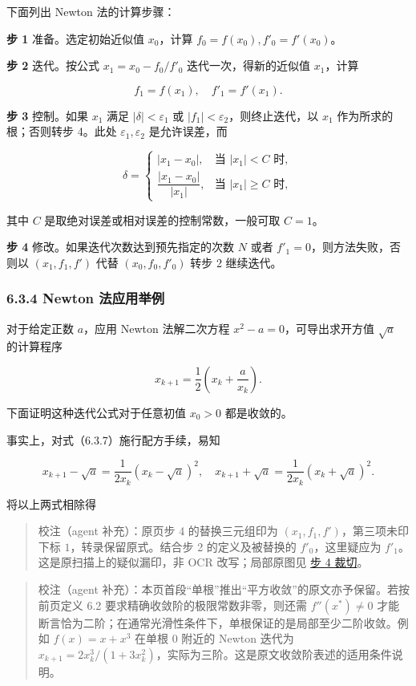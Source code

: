 下面列出 Newton 法的计算步骤：

\textbf{步 1} 准备。选定初始近似值 \(x_0\)，计算 \(f_0=f(x_0),f'_0=f'(x_0)\)。

\textbf{步 2} 迭代。按公式 \(x_1=x_0-f_0/f'_0\) 迭代一次，得新的近似值 \(x_1\)，计算

\[
f_1=f(x_1),\quad f'_1=f'(x_1).
\]

\textbf{步 3} 控制。如果 \(x_1\) 满足 \(|\delta|<\varepsilon_1\) 或 \(|f_1|<\varepsilon_2\)，则终止迭代，以 \(x_1\) 作为所求的根；否则转步 4。此处 \(\varepsilon_1,\varepsilon_2\) 是允许误差，而

\[
\delta=\begin{cases}
|x_1-x_0|,&\text{当 }|x_1|<C\text{ 时},\\
\dfrac{|x_1-x_0|}{|x_1|},&\text{当 }|x_1|\geqslant C\text{ 时},
\end{cases}
\]

其中 \(C\) 是取绝对误差或相对误差的控制常数，一般可取 \(C=1\)。

\textbf{步 4} 修改。如果迭代次数达到预先指定的次数 \(N\) 或者 \(f'_1=0\)，则方法失败，否则以 \((x_1,f_1,f')\) 代替 \((x_0,f_0,f'_0)\) 转步 2 继续迭代。

\subsubsection{6.3.4 Newton 法应用举例}\label{ch06-newton-ux6cd5ux5e94ux7528ux4e3eux4f8b}

对于给定正数 \(a\)，应用 Newton 法解二次方程 \(x^2-a=0\)，可导出求开方值 \(\sqrt{a}\) 的计算程序

\[
x_{k+1}=\frac{1}{2}\left(x_k+\frac{a}{x_k}\right).
\tag{6.3.7}
\]

下面证明这种迭代公式对于任意初值 \(x_0>0\) 都是收敛的。

事实上，对式（6.3.7）施行配方手续，易知

\[
x_{k+1}-\sqrt{a}=\frac{1}{2x_k}(x_k-\sqrt{a})^2,\quad
x_{k+1}+\sqrt{a}=\frac{1}{2x_k}(x_k+\sqrt{a})^2.
\]

将以上两式相除得

\begin{quote}
校注（agent 补充）：原页步 4 的替换三元组印为 \((x_1,f_1,f')\)，第三项未印下标 \(1\)，转录保留原式。结合步 2 的定义及被替换的 \(f'_0\)，这里疑应为 \(f'_1\)。这是原扫描上的疑似漏印，非 OCR 改写；局部原图见 \href{verified/assets/ch06/detail-p165-step4.png}{步 4 裁切}。
\end{quote}

\begin{quote}
校注（agent 补充）：本页首段``单根''推出``平方收敛''的原文亦予保留。若按前页定义 6.2 要求精确收敛阶的极限常数非零，则还需 \(f''(x^*)\ne0\) 才能断言恰为二阶；在通常光滑性条件下，单根保证的是局部至少二阶收敛。例如 \(f(x)=x+x^3\) 在单根 \(0\) 附近的 Newton 迭代为 \(x_{k+1}=2x_k^3/(1+3x_k^2)\)，实际为三阶。这是原文收敛阶表述的适用条件说明。
\end{quote}

